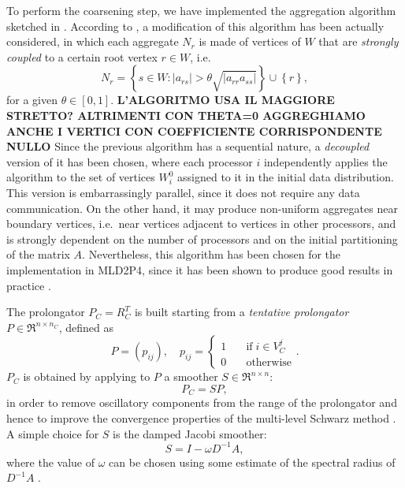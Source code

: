 To perform the coarsening step, we have implemented the aggregation algorithm sketched
in \cite{apnum_07}. According to \cite{brezina_vanek}, a modification of this algorithm
has been actually considered,
in which each aggregate $N_r$ is made of vertices of $W$ that are \emph{strongly coupled}
to a certain root vertex $r \in W$, i.e.\
\[  N_r = \left\{s \in W: |a_{rs}| > \theta \sqrt{|a_{rr}a_{ss}|} \right\}
    \cup \left\{ r \right\} ,
\]
for a given $\theta \in [0,1]$. \textbf{L'ALGORITMO USA IL MAGGIORE STRETTO? ALTRIMENTI
CON THETA=0 AGGREGHIAMO ANCHE I VERTICI CON COEFFICIENTE CORRISPONDENTE NULLO}
Since the previous algorithm has a sequential nature, a \emph{decoupled} version of
it has been chosen, where each processor $i$ independently applies the algorithm to
the set of vertices $W_i^0$ assigned to it in the initial data distribution. This
version is embarrassingly parallel, since it does not require any data communication.
On the other hand, it may produce non-uniform aggregates near boundary vertices,
i.e.\ near vertices adjacent to vertices in other processors, and is strongly
dependent on the number of processors and on the initial partitioning of the matrix $A$.
Nevertheless, this algorithm has been chosen for the implementation in MLD2P4,
since it has been shown to produce good results in practice
\cite{Tuminaro_Tong_00,apnum_07,aaecc_07}.

The prolongator $P_C=R_C^T$ is built starting from a \emph{tentative prolongator}
$P \in \Re^{n \times n_C}$, defined as
\begin{equation} 
P=(p_{ij}), \quad  p_{ij}= 
\left\{ \begin{array}{ll}
1 & \quad \mbox{if} \; i \in V^j_C \\
0 & \quad \mbox{otherwise}
\end{array} \right. .
\label{eq:tent_prol}
\end{equation}
$P_C$ is obtained by
applying to $P$ a smoother $S \in \Re^{n \times n}$:
\begin{equation}
P_C = S P,
\label{eq:smoothed_prol}
\end{equation}
in order to remove oscillatory components from the range of the prolongator
and hence to improve the convergence properties of the multi-level
Schwarz method \cite{Brezina_Vanek_,StubenGMD69_99}.
A simple choice for $S$ is the damped Jacobi smoother:
\begin{equation}
S = I - \omega D^{-1} A , 
\label{eq:jac_smoother}
\end{equation}
where the value of $\omega$ can be chosen
using some estimate of the spectral radius of $D^{-1}A$ \cite{Brezina_Vanek}.
%
%

